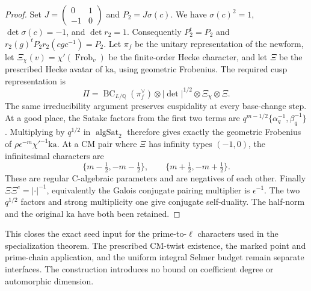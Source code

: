 \begin{proof}
Set
\(J=\left(\begin{smallmatrix}0&1\\-1&0\end{smallmatrix}\right)\)
and \(P_2=J\sigma(c)\).  We have \(\sigma(c)^2=1\),
\(\det\sigma(c)=-1\), and \(\det r_2=1\).
Consequently \(P_2^t=P_2\) and
\(r_2(g)^tP_2r_2(cgc^{-1})=P_2\).
Let \(\pi_f\) be the unitary representation of the newform, let
\(\Xi_\chi(v)=\chi'(\operatorname{Frob}_v)\) be the finite-order
Hecke character, and let \(\Xi\) be the prescribed Hecke avatar
of \(\mathrm{ka}\), using geometric Frobenius.  The required cusp
representation is
\[
 \Pi=\operatorname{BC}_{L/\mathbb Q}(\pi_f^\vee)
        \otimes|\det|^{1/2}\otimes\Xi_\chi\otimes\Xi.
\]
The same irreducibility argument preserves cuspidality at every
base-change step.  At a good place, the Satake factors from the first
two terms are \(q^{m-1/2}\{\alpha_q^{-1},\beta_q^{-1}\}\).
Multiplying by \(q^{1/2}\) in \(\operatorname{algSat}_2\)
therefore gives exactly the geometric Frobenius of
\(\rho\epsilon^{-m}\chi'^{-1}\mathrm{ka}\).
At a CM pair where \(\Xi\) has infinity types \((-1,0)\), the
infinitesimal characters are
\[
 \{m-\tfrac12,-m-\tfrac12\},\qquad
 \{m+\tfrac12,-m+\tfrac12\}.
\]
These are regular C-algebraic parameters and are negatives of each
other.  Finally \(\Xi\Xi^c=|\cdot|^{-1}\), equivalently the
Galois conjugate pairing multiplier is \(\epsilon^{-1}\).
The two \(q^{1/2}\) factors and strong multiplicity one give
conjugate self-duality.  The half-norm and the original
\(\mathrm{ka}\) have both been retained.
\end{proof}

This closes the exact seed input for the prime-to-\(\ell\) characters
used in the specialization theorem.  The prescribed CM-twist existence,
the marked point and prime-chain application, and the uniform integral
Selmer budget remain separate interfaces.  The construction introduces
no bound on coefficient degree or automorphic dimension.
